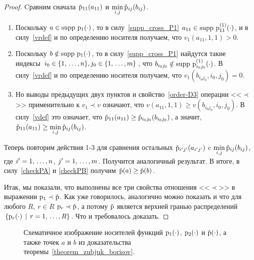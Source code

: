 \begin{proof}
Cравним сначала $\check{{\mathrm{p}}}_{11}(a_{11})$ и $\displaystyle \min_{i,j} \check{{\mathrm{p}}}_{ij}(b_{ij})$. 
\begin{enumerate}
\item Поскольку $a \in \supp\ \p_1\cd$, то в силу~\eqref{supp_cross_P1} $a_{11} \in {\mathrm{supp}}\ {{\mathrm{p}}}^{(1)}_{11}(\cdot)$, и в силу~\eqref{vrdef} %
и по определению носителя получаем, что $v_1(a_{11}, 1,1) > 0$.
\item Поскольку $b \notin \supp\ \p_1\cd$, то в силу~\eqref{supp_cross_P1} найдутся такие индексы $i_0 \in \{1,\, \ldots, n\}, j_0 \in \{1,\, \ldots, m\}$, что $b_{i_0j_0} \notin \supp\ {\p}^{(1)}_{i_0j_0}\cd$. В силу~\eqref{vrdef} и по определению носителя получаем, что $v_1(b_{i_0j_0}, i_0, j_0) = 0$.
\item Но выводы предыдущих двух пунктов и свойство~\ref{order-D3} операции <<$\prec$>> применительно к $v_1 \prec v$ означают, что $v(a_{11}, 1,1) \geq v(b_{i_0j_0}, i_0, j_0)$. В силу~\eqref{vdef} это означает, что $\check{{\mathrm{p}}}_{11}(a_{11}) \geq \check{{\mathrm{p}}}_{i_0j_0}(b_{i_0j_0})$, а значит, $\check{{\mathrm{p}}}_{11}(a_{11}) \geq \displaystyle \min_{i,j} \check{{\mathrm{p}}}_{ij}(b_{ij})$.
\end{enumerate}

Теперь повторим действия 1-3 для сравнения остальных $\check{{\mathrm{p}}}_{i'j'}(a_{i'j'})$ c $\displaystyle \min_{i,j} \check{{\mathrm{p}}}_{ij}(b_{ij})$, где $i' = 1,\, \ldots, n$, $j' = 1,\, \ldots, m$. Получится аналогичный результат. В итоге, в силу~\eqref{checkPA} и \eqref{checkPB} получим $\check{{\mathrm{p}}}(a) \geq \check{{\mathrm{p}}}(b)$. 

Итак, мы показали, что выполнены все три свойства отношения <<$\prec$>> в выражении 
 ${\mathrm{p}}_{1} \prec \check{{\mathrm{p}}}$. Как уже говорилось, аналогично можно показать и что для любого $R,\ r \in R$ ${\mathrm{p}}_{r} \prec \check{{\mathrm{p}}}$, а потому $\check{{\mathrm{p}}}$ является верхней гранью распределений $\{{\mathrm{p}}_r(\cdot) \,\mid\, r = 1,\, \ldots, R \}$. Что и требовалось доказать.
\end{proof}

\begin{figure}[h]
\caption{\small Схематичное изображение носителей функций ${\mathrm{p}}_1(\cdot)$, ${\mathrm{p}}_2(\cdot)$ и $\check{{\mathrm{p}}}(\cdot)$, а также точек $a$ и $b$ из доказательства теоремы~\ref{theorem_zubjuk_borisov}. }
\label{ris:boxes}
\end{figure}


